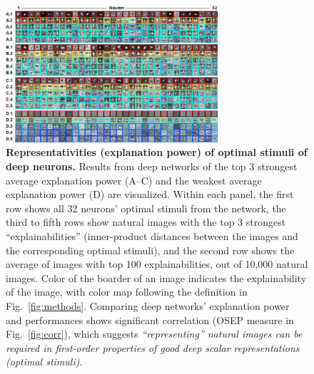 \documentclass[10pt,twocolumn,letterpaper]{article}
\begin{document}
\begin{figure}
\begin{center}
\includegraphics[width=0.70\textwidth]{Figs/pic2.pdf} 
\end{center}
\caption{{\bf Representativities (\ie explanation power) of optimal stimuli of deep neurons.}
Results from deep networks of the top 3 strongest average explanation power (A--C) and the weakest average explanation power (D) are visualized.
Within each panel, the first row shows all 32 neurons' optimal stimuli from the network, the third to fifth rows show natural images with the top 3 strongest ``explainabilities'' (\ie inner-product distances between the images and the corresponding optimal stimuli), and the second row shows the average of images with top 100 explainabilities, out of 10,000 natural images.
Color of the boarder of an image indicates the explainability of the image, with color map following the definition in Fig.~\ref{fig:methods}.
Comparing deep networks' explanation power and performances shows significant correlation (OSEP measure in Fig.~\ref{fig:corr}), which suggests \emph{``representing'' natural images can be required in first-order properties of good deep scalar representations (\ie optimal stimuli)}.
}
\label{fig:exppow}
\end{figure}
\end{document}
